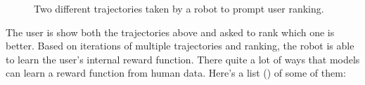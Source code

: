 \documentclass[
  letterpaper,
  numbers=noenddot,
  DIV=11]{scrreprt}
\theoremstyle{definition}
\theoremstyle{plain}
\theoremstyle{plain}
\theoremstyle{remark}
\begin{document}
\begin{figure}


\caption{\label{fig-reward-robot-1}Two different trajectories taken by a
robot to prompt user ranking.}

\end{figure}%

The user is show both the trajectories above and asked to rank which one
is better. Based on iterations of multiple trajectories and ranking, the
robot is able to learn the user's internal reward function. There quite
a lot of ways that models can learn a reward function from human data.
Here's a list () of
some of them:
\end{document}
